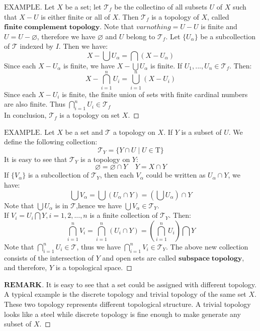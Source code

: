 \documentclass[a4paper, 11pt]{article}
\theoremstyle{remark}
\newenvironment{myremark}
{\renewcommand\qedsymbol{$ $}\begin{proof}[$\mathbf{REMARK}$]}
  {\end{proof}}
\newenvironment{myexam}
{\renewcommand\qedsymbol{$ $}\begin{proof}[$\mathrm{EXAMPLE}$]}
  {\end{proof}}
\theoremstyle{definition}
\begin{document}
 \begin{myexam}
        Let $X$ be a set; let $\mathcal{T}_{f}$ be the collectino of all subsets $U$ of
        $X$ such that $X-U$ is either finite or all of $X$. Then $\mathcal{T}_{f}$ is 
        a topology of $X$, called $\bm{finite\;complement\;topology}$. Note that
        $varnothing=U-U$ is finite and $U=U-\varnothing$, therefore we have $\varnothing$
        and $U$ belong to $\mathcal{T}_{f}$. Let $\{U_{\alpha}\}$ be a subcollection of 
        $\mathcal{T}$ indexed by $I$. Then we have:
        $$
        X-\bigcup U_{\alpha}=\bigcap(X-U_{\alpha})
        $$ Since each $X-U_{\alpha}$ is finite, we have $X-\bigcup U_{\alpha}$ is finite. If
        $U_1,...,U_n \in \mathcal{T}_{f}$. Then:
        $$
        X-\bigcap_{i=1}^{n} U_i=\bigcup_{i=1}^{n}(X-U_i)
        $$ Since each $X-U_i$ is finite, the finite union of sets with finite cardinal 
        numbers are also finite. Thus $\displaystyle \bigcap_{i=1}^{n} U_i\in \mathcal{T}_{f}$\\
        \indent In conclusion, $\mathcal{T}_{f}$ is a topology on set $X$.
         
 \end{myexam}
 
 \begin{myexam} 
Let $X$ be a set and $\mathcal{T}$ a topology on $X$. If $Y$ is a subset of $U$. We
define the following collection:
$$ 
\mathcal{T}_{Y} = \{Y\cap U\mid U\in \mathrm{T}\}
$$ It is easy to see that $\mathcal{T}_{Y}$ is a topology on $Y$:
$$
\varnothing = \varnothing \cap Y\;\;\;\;Y=X\cap Y
$$If $\{V_{\alpha}\}$ is a subcollection of $\mathcal{T}_{Y}$, then each $V_{\alpha}$
could be written as $U_{\alpha}\cap Y$, we have:
$$ 
\bigcup{V_{\alpha}} = \bigcup({U_{\alpha}}\cap Y) = (\bigcup U_{\alpha}) \cap Y
$$ Note that $\displaystyle \bigcup U_{\alpha}$ is in $\mathcal{T}$,hence we have 
$\displaystyle \bigcup V_{\alpha}\in \mathcal{T}_{Y}$. \\
If $ V_i=U_i\bigcap Y,i=1,2,...,n$ is a finite collection of $\mathcal{T}_{Y}$. Then:
$$
\bigcap_{i=1}^{n} V_i=\bigcap_{i=1}^{n} (U_i\cap Y) =(\bigcap_{i=1}^{n} U_i)\bigcap Y
$$ Note that $\displaystyle \bigcap_{i=1}^{n} U_i\in \mathcal{T}$, thus we have 
$\displaystyle \bigcap_{i=1}^{n}V_i\in \mathcal{T}_{Y}$.
The above new collection consists of the intersection of $Y$ and open sets are called 
$\bm{subspace\; topology}$, and therefore, $Y$ is a topological space.
\end{myexam}

\begin{myremark}
        It is easy to see that a set could be assigned with different topology. A typical
        example is the discrete topology and trivial topology of the same set $X$. These
        two topology represents different topological structure. A trivial topology looks
        like a steel while discrete topology is fine enough to make generate any subset
        of $X$.
\end{myremark}
\end{document}
